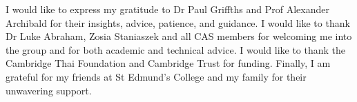 
\begin{acknowledgements}      



I would like to express my gratitude to Dr Paul Griffths and Prof Alexander Archibald for their insights, advice, patience, and guidance. I would like to thank Dr Luke Abraham, Zosia Staniaszek and all CAS members for welcoming me into the group and for both academic and technical advice. I would like to thank the Cambridge Thai Foundation and Cambridge Trust for funding. Finally, I am grateful for my friends at St Edmund’s College and my family for their unwavering support.




\end{acknowledgements}
